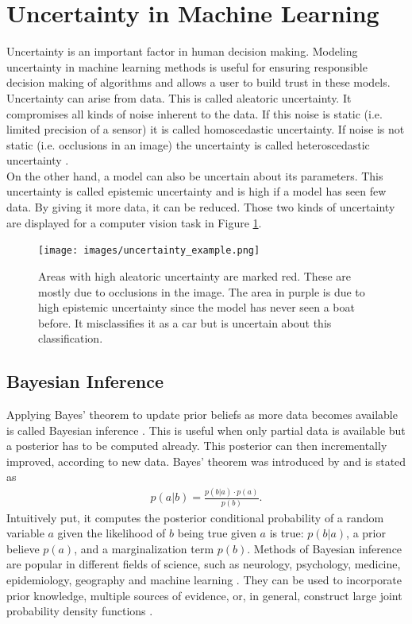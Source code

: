 \documentclass[a4paper,cleardoubleempty,BCOR1cm, 11pt]{report}
\begin{document}
\section{Uncertainty in Machine Learning}
Uncertainty is an important factor in human decision making. Modeling uncertainty in machine learning methods is useful for ensuring responsible decision making of algorithms and allows a user to build trust in these models. Uncertainty can arise from data. This is called aleatoric uncertainty. It compromises all kinds of noise inherent to the data. If this noise is static (i.e. limited precision of a sensor) it is called homoscedastic uncertainty. If noise is not static (i.e. occlusions in an image) the uncertainty is called heteroscedastic uncertainty \cite{kwon2020uncertainty}.\\
On the other hand, a model can also be uncertain about its parameters. This uncertainty is called epistemic uncertainty and is high if a model has seen few data. By giving it more data, it can be reduced. Those two kinds of uncertainty are displayed for a computer vision task in Figure \ref{fig:uncertainty_example}.
\begin{figure}
	\centering
	\texttt{[image: images/uncertainty\_example.png]} 
	\caption{Areas with high aleatoric uncertainty are marked red. These are mostly due to occlusions in the image. The area in purple is due to high epistemic uncertainty since the model has never seen a boat before. It misclassifies it as a car but is uncertain about this classification.}
	\label{fig:uncertainty_example}
\end{figure}


\subsection{Bayesian Inference}
Applying Bayes' theorem to update prior beliefs as more data becomes available is called Bayesian inference \cite{box2011bayesian}. This is useful when only partial data is available but a posterior has to be computed already. This posterior can then incrementally improved, according to new data.
 Bayes' theorem was introduced by \citet{bayes1763lii} and is stated as
\begin{align}\label{eq:bayestheorem}
	p(a|b) = \frac{p(b|a) \cdot p(a)}{p(b)}.
\end{align}
Intuitively put, it computes the posterior conditional probability of a random variable $a$ given the likelihood of $b$ being true given $a$ is true: $p(b|a)$, a prior believe $p(a)$, and a marginalization term $p(b)$. Methods of Bayesian inference are popular in different fields of science, such as neurology, psychology, medicine, epidemiology, geography and machine learning \cite{friston2002classical,wagenmakers2018bayesian,koch2006bayesian,parmigiani2002modeling,didelot2014bayesian,ghahramani2015probabilistic}. They can be used to incorporate prior knowledge, multiple sources of evidence, or, in general, construct large joint probability density functions \cite{Spiegelhalter:2009}.
\end{document}
